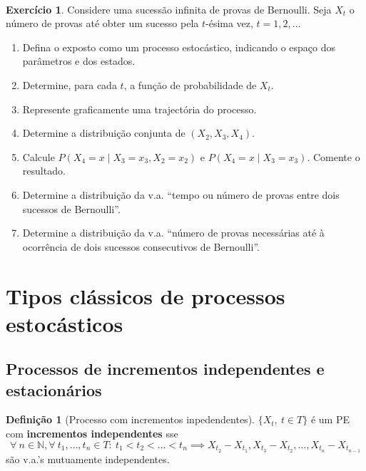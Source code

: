 \documentclass[
  11pt,
  a4paper,
]{book}
\theoremstyle{definition}
\newtheorem{definition}{Definição}[chapter]
\theoremstyle{definition}
\theoremstyle{definition}
\newtheorem{exercise}{Exercício}[chapter]
\theoremstyle{definition}
\theoremstyle{remark}
\begin{document}
\(\,\)

\begin{exercise}
\leavevmode

Considere uma sucessão infinita de provas de Bernoulli. Seja
\(X_{t}\) o número de provas até obter um sucesso pela \(t\)-ésima
vez, \(t = 1, 2, \ldots\)

\begin{enumerate}
\def\labelenumi{(\alph{enumi})}
\item
  Defina o exposto como um processo estocástico, indicando o espaço dos parâmetros e dos estados.
\item
  Determine, para cada \(t\), a função de probabilidade de \(X_{t}\).
\item
  Represente graficamente uma trajectória do processo.
\item
  Determine a distribuição conjunta de \((X_{2}, X_{3}, X_{4})\).
\item
  Calcule \(P(X_{4} = x \mid X_{3} = x_{3}, X_{2} = x_{2})\) e \(P(X_{4} = x \mid X_{3} = x_{3})\). Comente o resultado.
\item
  Determine a distribuição da v.a. ``tempo ou número de provas entre dois sucessos de Bernoulli''.
\item
  Determine a distribuição da v.a. ``número de provas necessárias até à ocorrência de dois sucessos consecutivos de Bernoulli''.
\end{enumerate}

\end{exercise}

\section{Tipos clássicos de processos estocásticos}\label{tipos-classicos-de-processos-estocasticos}

\subsection{Processos de incrementos independentes e estacionários}\label{processos-de-incrementos-independentes-e-estacionarios}

\begin{definition}[Processo com incrementos inpedendentes]
\(\{X_t, ~ t \in T\}\) é um PE com \textbf{incrementos independentes} sse
\[\forall ~n \in \mathbb{N}, \forall ~t_1, \ldots,t_n \in T: ~t_1 <t_2<\ldots<t_n \implies X_{t_2}-X_{t_1}, X_{t_3}-X_{t_2},\ldots,X_{t_n}-X_{t_{n-1}}\]
são v.a.'s mutuamente independentes.
\end{definition}
\end{document}
